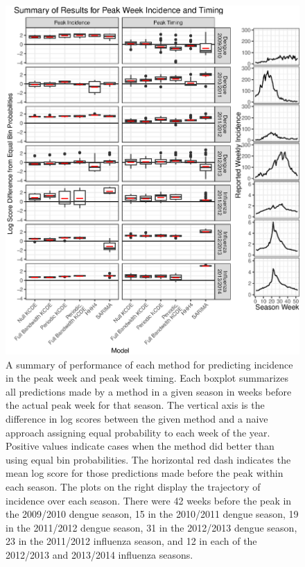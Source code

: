 \documentclass[times, doublespace]{simauth}\usepackage[]{graphicx}\usepackage[]{color}
\makeatletter
\def\maxwidth{ %
  \ifdim\Gin@nat@width>\linewidth
    \linewidth
  \else
    \Gin@nat@width
  \fi
}
\newenvironment{knitrout}{}{} %
\makeatother
\begin{document}
\begin{figure}
\begin{knitrout}
\color{fgcolor}
\includegraphics[width=\maxwidth]{figure/Fig6_Evan_L_Ray_PeakIncidenceLogScoreDiffFromEqualBoxplots-1} 

\end{knitrout}
\caption{A summary of performance of each method for predicting incidence in the peak week and
peak week timing.  Each boxplot summarizes all predictions made by a method in a given
season in weeks before the actual peak week for that season.  The vertical
axis is the difference in log scores between the given method and a naive approach assigning
equal probability to each week of the year.  Positive values indicate cases when
the method did better than using equal bin probabilities.  The horizontal red dash
indicates the mean log score for those predictions made before the peak within each season.
The plots on the right display the trajectory of incidence over each season.  There were
42 weeks before the peak in the 2009/2010 dengue season, 15 in the 2010/2011 dengue season,
19 in the 2011/2012 dengue season, 31 in the 2012/2013 dengue season,
23 in the 2011/2012 influenza season, and 12 in each of the 2012/2013 and 2013/2014 influenza seasons.
}
\label{fig:CombinedPeakWeekTimingPredictionLogScores}
\end{figure}
\end{document}
